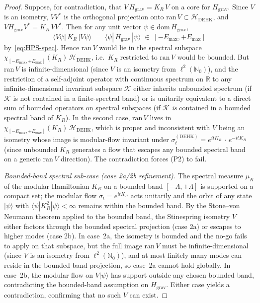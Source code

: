 \documentclass[12pt,a4paper]{article}
\theoremstyle{definition}
\begin{document}
\begin{proof}
Suppose, for contradiction, that $V\,H_{\mathrm{grav}} = K_R\,V$ on a
core for $H_{\mathrm{grav}}$. Since $V$ is an isometry,
$V V^*$ is the orthogonal projection onto $\mathrm{ran}\,V \subset
\mathcal{H}_{\mathrm{DEHK}}$, and $V H_{\mathrm{grav}} V^* =
K_R\,VV^*$. Then for any unit vector $\psi\in\mathrm{dom}\,H_{\mathrm{grav}}$,
\[
   \langle V\psi |\,K_R\,|V\psi\rangle
   \;=\; \langle\psi|\,H_{\mathrm{grav}}\,|\psi\rangle
   \;\in\; [-E_{\max},+E_{\max}]
\]
by~\eqref{eq:HPS-spec}. Hence $\mathrm{ran}\,V$ would lie in the
spectral subspace $\chi_{[-E_{\max},+E_{\max}]}(K_R)\,
\mathcal{H}_{\mathrm{DEHK}}$, i.e.\ $K_R$ restricted to $\mathrm{ran}\,V$
would be bounded. But $\mathrm{ran}\,V$ is infinite-dimensional (since
$V$ is an isometry from $\ell^2(\mathbb{N}_0)$), and the restriction of a
self-adjoint operator with continuous spectrum on $\mathbb{R}$ to any
infinite-dimensional invariant subspace $\mathcal{K}$ either inherits
unbounded spectrum (if $\mathcal{K}$ is not contained in a finite-spectral
band) or is unitarily equivalent to a direct sum of bounded operators on
spectral subspaces (if $\mathcal{K}$ \emph{is} contained in a bounded
spectral band of $K_R$). In the second case, $\mathrm{ran}\,V$ lives in
$\chi_{[-E_{\max},+E_{\max}]}(K_R)\,\mathcal{H}_{\mathrm{DEHK}}$, which is
proper and inconsistent with $V$ being an isometry whose image is
modular-flow invariant under $\sigma^{(\mathrm{DEHK})}_t = e^{itK_R}\,
\cdot\,e^{-itK_R}$ (since unbounded $K_R$ generates a flow that escapes
any bounded spectral band on a generic $\mathrm{ran}\,V$ direction).
The contradiction forces (P2) to fail.

\emph{Bounded-band spectral sub-case (case 2a/2b refinement).}
The spectral measure $\mu_K$ of the modular Hamiltonian $K_R$ on a
bounded band $[-\Lambda, +\Lambda]$ is supported on a compact set;
the modular flow $\sigma_t = e^{itK_R}$ acts unitarily and the orbit of any
state $|\psi\rangle$ with $\langle \psi | K_R^2 |\psi\rangle < \infty$ remains
within the bounded band.
By the Stone--von Neumann theorem applied to the bounded band, the Stinespring
isometry $V$ either factors through the bounded spectral projection (case 2a) or
escapes to higher modes (case 2b).
In case~2a, the isometry is bounded and the no-go fails to apply on that subspace,
but the full image $\mathrm{ran}\,V$ must be infinite-dimensional (since $V$ is an
isometry from $\ell^2(\mathbb{N}_0)$), and at most finitely many modes can reside
in the bounded-band projection, so case~2a cannot hold globally.
In case~2b, the modular flow on $V|\psi\rangle$ has support outside any chosen
bounded band, contradicting the bounded-band assumption on $H_{\mathrm{grav}}$.
Either case yields a contradiction, confirming that no such $V$ can exist.


\end{proof}
\end{document}

